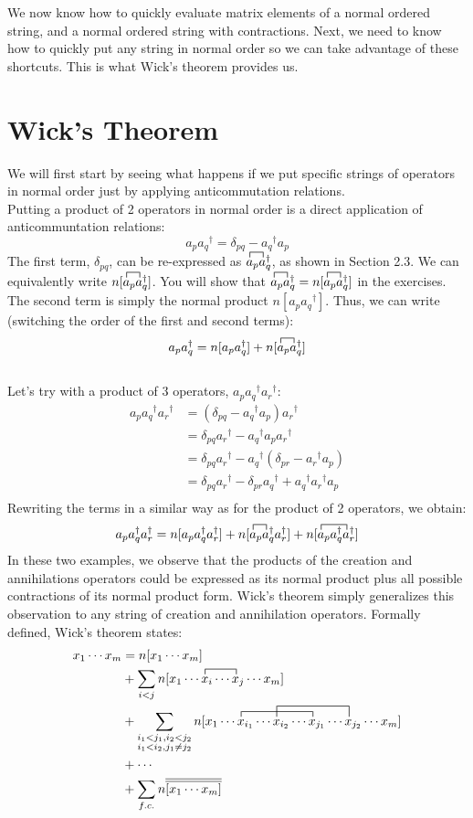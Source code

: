 \documentclass{article}
\newcommand{\ol}{\overline}
\newcommand{\dg}{\ensuremath{^\dagger} }
\newcommand{\cd}{\ensuremath{\cdots} }
\begin{document}
We now know how to quickly evaluate matrix elements of a normal ordered string, and a normal ordered string with contractions.
Next, we need to know how to quickly put any string in normal order so we can take advantage of these shortcuts. 
This is what Wick's theorem provides us. 

\section{Wick's Theorem}
We will first start by seeing what happens if we put specific strings of operators in normal order just by applying anticommutation relations.  \\ 
Putting a product of 2 operators in normal order is a direct application of anticommuntation relations: 
\[a_p a_q\dg = \delta_{pq} - a_q\dg a_p \]
The first term, $\delta_{pq}$, can be re-expressed as $\contraction{}{a}{{}_p}{a}a_p a_q\dg$, as shown in Section 2.3. 
We can equivalently write $n[\contraction{}{a}{{}_p}{a}a_p a_q\dg]$.
You will show that $\contraction{}{a}{{}_p}{a}a_p a_q\dg = n[\contraction{}{a}{{}_p}{a}a_p a_q\dg]$ in the exercises. 
The second term is simply the normal product $n[a_p a_q\dg]$. 
Thus, we can write (switching the order of the first and second terms): 
\[a_p a_q\dg = n[a_p a_q\dg] + n[\contraction{}{a}{{}_p}{a}a_p a_q\dg] \]
\\
Let's try with a product of 3 operators, $a_p a_q\dg a_r\dg$: 
\begin{align*}
a_p a_q\dg a_r\dg &= (\delta_{pq} - a_q\dg a_p)a_r\dg \\
&= \delta_{pq}a_r\dg  - a_q\dg a_p a_r\dg \\
& = \delta_{pq}a_r\dg - a_q\dg (\delta_{pr} - a_r\dg a_p)  \\
& = \delta_{pq}a_r\dg - \delta_{pr} a_q\dg +  a_q\dg a_r\dg a_p  \\
\end{align*}
Rewriting the terms in a similar way as for the product of 2 operators, we obtain:
\[a_p a_q\dg a_r\dg  = n[a_p a_q\dg a_r\dg ] + n[\contraction{}{a}{{}_p}{a} a_p a_q\dg a_r\dg ]  + n[\contraction{}{a}{{}_p a_q\dg}{a} a_p a_q\dg a_r\dg ] \]
In these two examples, we observe that the products of the creation and annihilations operators could be expressed as its normal product plus all possible contractions of its normal product form.
Wick's theorem simply generalizes this observation to any string of creation and annihilation operators. 
Formally defined, Wick's theorem states: 
\begin{align*}
x_1 \cd x_m &= n[x_1 \cd x_m ]  \\
&+ \sum_{i < j} \contraction{n[x_1 \cd}{x}{{}_i \cd }{x} n[x_1 \cd x_i \cd x_j\cd  x_m] \\
&+ \sum_{\substack{i_1 < j_1,  i_2 < j_2 \\ i_1 < i_2, j_1 \neq j_2}} 
\contraction{n[x_1 \cd}{x}{{}_{i_1} \cd x_{i_2} \cd}{x}
\contraction[2ex]{n[x_1 \cd x_{i_1} \cd }{x}{{}_{i_2} \cd x_{j_1} \cd}{x}
n[x_1 \cd x_{i_1} \cd x_{i_2} \cd x_{j_1} \cd x_{j_2} \cd x_m ]  \\
&+ \cd \\
&+ \sum_{f.c.} n \ol{\ol{[x_1 \cd x_m]  }}
\end{align*}
\end{document}
